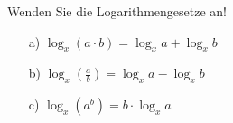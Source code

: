 \label{sec:aufgabe12}
Wenden Sie die Logarithmengesetze an!

\begin{itemize}[leftmargin=*]
    \item[a)] $\log_x(a \cdot b) = \log_x a + \log_x b$
    \item[b)] $\log_x\left(\frac{a}{b}\right) = \log_x a - \log_x b$
    \item[c)] $\log_x\left(a^b\right) = b \cdot \log_x a$ 
\end{itemize}

